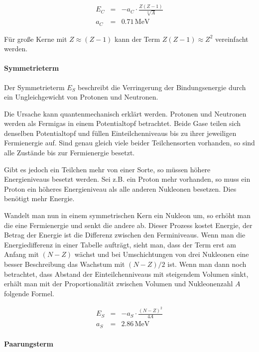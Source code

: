 \documentclass[12pt,a4paper]{scrartcl}
\numberwithin{equation}{section} %
\begin{document}
\begin{eqnarray}
	E_C &=& - a_C\cdot \frac{Z(Z-1)}{\sqrt[3]{A}} \label{Coulombterm} \\
	a_C &=& 0.71\mathrm{\,MeV}
\end{eqnarray}

\noindent
Für große Kerne mit $Z\approx(Z-1)$ kann der Term $Z(Z-1)\approx Z^2$ vereinfacht werden.

\hypertarget{symmetrieterm}{%
	\paragraph{Symmetrieterm}\label{symmetrieterm}}

Der Symmetrieterm $E_S$ beschreibt die Verringerung der Bindungsenergie durch ein Ungleichgewicht von Protonen und Neutronen.

Die Ursache kann quantenmechanisch erklärt werden. Protonen und Neutronen werden als Fermigas in einem Potentialtopf betrachtet. Beide Gase teilen sich denselben Potentialtopf und füllen Einteilchenniveaus bis zu ihrer jeweiligen Fermienergie auf. Sind genau gleich viele beider Teilchensorten vorhanden, so sind alle Zustände bis zur Fermienergie besetzt.

Gibt es jedoch ein Teilchen mehr von einer Sorte, so müssen höhere Energieniveaus besetzt werden. Sei z.B. ein Proton mehr vorhanden, so muss ein Proton ein höheres Energieniveau als alle anderen Nukleonen besetzen. Dies benötigt mehr Energie.

Wandelt man nun in einem symmetrischen Kern ein Nukleon um, so erhöht man die eine Fermienergie und senkt die andere ab. Dieser Prozess kostet Energie, der Betrag der Energie ist die Differenz zwischen den Ferminiveaus. Wenn man die Energiedifferenz in einer Tabelle aufträgt, sieht man, dass der Term erst am Anfang mit $(N-Z)$ wächst und bei Umschichtungen von drei Nukleonen eine besser Beschreibung das Wachstum mit $(N-Z)/2$ ist. Wenn man dann noch betrachtet, dass Abstand der Einteilchenniveaus mit steigendem Volumen sinkt, erhält man mit der Proportionalität zwischen Volumen und Nukleonenzahl $A$ folgende Formel.

\begin{eqnarray}
	E_S &=& - a_S\cdot \frac{(N-Z)^2}{4A} \label{Symmetrieterm} \\
	a_S &=& 2.86\mathrm{\,MeV}
\end{eqnarray}

\hypertarget{paarungsterm}{%
	\paragraph{Paarungsterm}\label{paarungsterm}}
\end{document}
